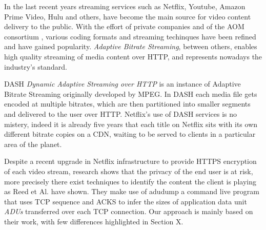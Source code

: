 
In the last recent years streaming services such as Netflix, Youtube, Amazon
Prime Video, Hulu and others, have become the main source for video content
delivery to the public. With the effort of private companies and of the AOM
consortium \cite{aom}, various coding formats and streaming techinques have
been refined and have gained popularity. \textit{Adaptive Bitrate Streaming},
between others, enables high quality streaming of media content over HTTP, and
represents nowadays the industry's standard. 

DASH \textit{Dynamic Adaptive Streaming over HTTP} is an instance of Adaptive
Bitrate Streaming originally developed by MPEG. In DASH each media file gets
encoded at multiple bitrates, which are then partitioned into smaller segments
and delivered to the user over HTTP.  Netflix's use of DASH services is no
mistery, indeed it is already five years that each title on Netflix sits with
its own different bitrate copies on a CDN, waiting to be served to clients in a
particular area of the planet. \cite{per-title-encoding}

Despite a recent upgrade in Netflix infrastructure to provide HTTPS encryption
of each video stream, research shows that the privacy of the end user is at
risk, more precisely there exist techniques to identify the content the client
is playing as Reed et Al. \cite{netflix-real-time} have shown. They make use of
adudump \cite{adudump} a command live program that uses TCP sequence and ACKS
to infer the sizes of application data unit \emph{ADUs} transferred over each
TCP connection. Our approach is mainly based on their work, with few
differences highlighted in Section X.

